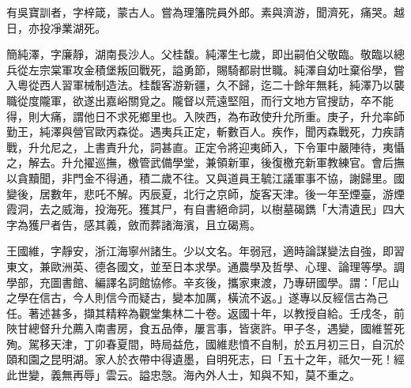 \begin{pinyinscope}
有吳寶訓者，字梓箴，蒙古人。嘗為理籓院員外郎。素與濟游，聞濟死，痛哭。越日，亦投凈業湖死。

簡純澤，字廉靜，湖南長沙人。父桂馥。純澤生七歲，即出嗣伯父敬臨。敬臨以總兵從左宗棠軍攻金積堡叛回戰死，謚勇節，賜騎都尉世職。純澤自幼吐棄俗學，嘗入粵從西人習軍械制造法。桂馥客游新疆，久不歸，迄二十餘年無耗，純澤乃以襲職從度隴軍，欲遂出嘉峪關覓之。隴督以荒遠堅阻，而行文地方官搜訪，卒不能得，則大痛，謂他日不求死鄉里也。入陜西，為布政使升允所重。庚子，升允率師勤王，純澤與營官歐丙森從。遇夷兵正定，斬數百人。疾作，聞丙森戰死，力疾請戰，升允尼之，上書責升允，詞甚直。正定令將迎夷師入，下令軍中嚴陣待，夷懾之，解去。升允擢巡撫，檄管武備學堂，兼領新軍，後復檄充新軍教練官。會后撫以貪黷聞，非門金不得通，積二歲不往。又與道員王毓江議軍事不協，謝歸里。國變後，居數年，悲吒不解。丙辰夏，北行之京師，旋客天津。後一年至煙臺，游煙霞洞，去之威海，投海死。獲其尸，有自書絕命詞，以樹墓碣鐫「大清遺民」四大字為獲尸者告，感其義，斂而葬諸海濱，且立碣焉。

王國維，字靜安，浙江海寧州諸生。少以文名。年弱冠，適時論謀變法自強，即習東文，兼歐洲英、德各國文，並至日本求學。通農學及哲學、心理、論理等學。調學部，充圖書館、編譯名詞館協修。辛亥後，攜家東渡，乃專研國學。謂：「尼山之學在信古，今人則信今而疑古，變本加厲，橫流不返。」遂專以反經信古為己任。著述甚多，擷其精粹為觀堂集林二十卷。返國十年，以教授自給。壬戌冬，前陜甘總督升允薦入南書房，食五品俸，屢言事，皆褒許。甲子冬，遇變，國維誓死殉。駕移天津，丁卯春夏間，時局益危，國維悲憤不自制，於五月初三日，自沉於頤和園之昆明湖。家人於衣帶中得遺墨，自明死志，曰「五十之年，祗欠一死！經此世變，義無再辱」雲云。謚忠愨。海內外人士，知與不知，莫不重之。


\end{pinyinscope}